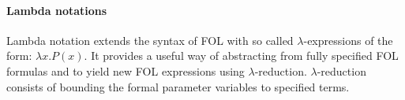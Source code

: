 






\paragraph{Lambda notations} Lambda notation extends the syntax of FOL with so called $\lambda$-expressions of the form: $\lambda x.P(x)$. It provides a useful way of abstracting from fully specified FOL formulas and to yield new FOL expressions using $\lambda$-reduction. $\lambda$-reduction consists of bounding the formal parameter variables to specified terms.

